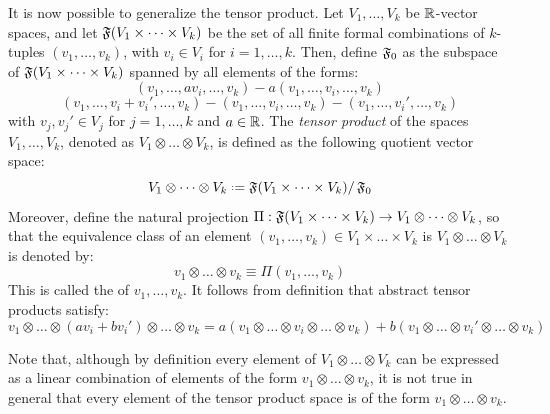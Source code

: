 It is now possible to generalize the tensor product. Let $ V_1 , \dots , V_k $ be $ \mathbb{R} $-vector spaces, and let $ \operatorname{\mathfrak{F}}(V_1 \times \dots \times V_k) $ be the set of all finite formal combinations of $ k $-tuples $ (v_1 , \dots , v_k) $, with $ v_i \in V_i $ for $ i = 1 , \dots , k $. Then, define $ \operatorname{\mathfrak{F}}_0 $ as the subspace of $ \operatorname{\mathfrak{F}}(V_1 \times \dots \times V_k) $ spanned by all elements of the forms:
\begin{equation*}
  (v_1 , \dots , a v_i , \dots , v_k) - a (v_1 , \dots , v_i , \dots , v_k)
\end{equation*}
\begin{equation*}
  (v_1 , \dots , v_i + v_i' , \dots , v_k) - (v_1 , \dots , v_i , \dots , v_k) - (v_1 , \dots , v_i' , \dots , v_k)
\end{equation*}
with $ v_j , v_j' \in V_j $ for $ j = 1 , \dots , k $ and $ a \in \mathbb{R} $. The \emph{tensor product} of the spaces $ V_1 , \dots , V_k $, denoted as $ V_1 \otimes \dots \otimes V_k $, is defined as the following quotient vector space:
\begin{equation}
  V_1 \otimes \dots \otimes V_k \defeq \free(V_1 \times \dots \times V_k) / \free_0
\end{equation}
Moreover, define the natural projection $ \Pi : \operatorname{\mathfrak{F}}(V_1 \times \dots \times V_k) \rightarrow V_1 \otimes \dots \otimes V_k $, so that the equivalence class of an element $ (v_1 , \dots , v_k) \in V_1 \times \dots \times V_k $ is $ V_1 \otimes \dots \otimes V_k $ is denoted by:
\begin{equation}
  v_1 \otimes \dots \otimes v_k \equiv \Pi(v_1 , \dots , v_k)
\end{equation}
This is called the  of $ v_1 , \dots , v_k $. It follows from definition that abstract tensor products satisfy:
\begin{equation*}
  v_1 \otimes \dots \otimes (a v_i + b v_i') \otimes \dots \otimes v_k = a (v_1 \otimes \dots \otimes v_i \otimes \dots \otimes v_k) + b (v_1 \otimes \dots \otimes v_i' \otimes \dots \otimes v_k)
\end{equation*}

Note that, although by definition every element of $ V_1 \otimes \dots \otimes V_k $ can be expressed as a linear combination of elements of the form $ v_1 \otimes \dots \otimes v_k $, it is not true in general that every element of the tensor product space is of the form $ v_1 \otimes \dots \otimes v_k $.

